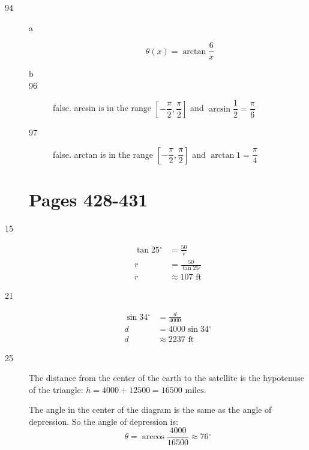 \documentclass[fleqn,addpoints]{exam}
\newcommand{\degree}{\ensuremath{^\circ}}
\begin{document}
\begin{description}
\begin{description}
\end{description}

\item[94]

\begin{description}
\item[a]
\[
  \theta(x) = \arctan \frac{6}{x}
\]

\item[b]

\item[96]
false.  arcsin is in the range $\left[ -\dfrac{\pi}{2}, \dfrac{\pi}{2} \right]$ and $\arcsin \dfrac{1}{2} = \dfrac{\pi}{6}$

\item[97]
false.  arctan is in the range $\left[ -\dfrac{\pi}{2}, \dfrac{\pi}{2} \right]$ and $\arctan 1 = \dfrac{\pi}{4}$

\end{description}

\section{Pages 428-431}

\item[15]
\begin{align*}
  \tan 25 \degree &= \frac{50}{r} \\
  r &= \frac{50}{\tan 25 \degree} \\
  r &\approx 107 \text{ ft}
\end{align*}

\item[21]
\begin{align*}
  \sin 34 \degree &= \frac{d}{4000} \\
  d &= 4000 \sin 34 \degree \\
  d &\approx 2237 \text{ ft}
\end{align*}

\item[25]
The distance from the center of the earth to the satellite is the hypotenuse of the triangle: $h = 4000 + 12500 = 16500 \text{ miles}$.

The angle in the center of the diagram is the same as the angle of depression.  So the angle of depression is:
\[
  \theta = \arccos \frac{4000}{16500} \approx 76 \degree
\]


\end{description}
\end{document}
